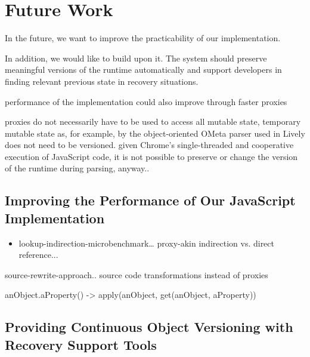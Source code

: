 \chapter{Future Work} \label{sec:FUTURE_WORK}

In the future, we want to improve the practicability of our implementation.

In addition, we would like to build upon it.
The system should preserve meaningful versions of the runtime automatically and support developers in finding relevant previous state in recovery situations.

performance of the implementation could also improve through faster proxies

proxies do not necessarily have to be used to access all mutable state, temporary mutable state as, for example, by the object-oriented OMeta parser used in Lively does not need to be versioned. 
given Chrome's single-threaded and cooperative execution of JavaScript code, it is not possible to preserve or change the version of the runtime during parsing, anyway..

\section{Improving the Performance of Our JavaScript Implementation}

\begin{itemize}
    \item lookup-indirection-microbenchmark… proxy-akin indirection vs. direct reference...
\end{itemize}

source-rewrite-approach.. source code transformations instead of proxies

anObject.aProperty() -> apply(anObject, get(anObject, aProperty))


\section{Providing Continuous Object Versioning with Recovery Support Tools}

